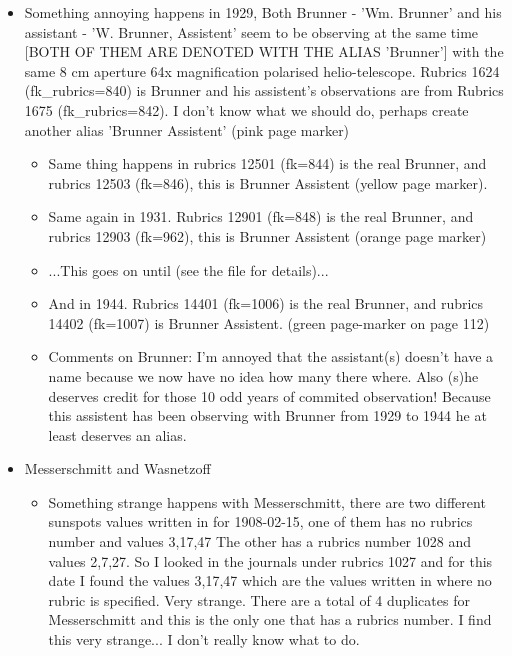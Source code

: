 \documentclass[12pt]{article}
\begin{document}
\begin{itemize}
\begin{itemize}
    \item Something annoying happens in 1929, Both Brunner - 'Wm. Brunner'  and his assistant - 'W. Brunner, Assistent' seem to be observing at the same time [BOTH OF THEM ARE DENOTED WITH THE ALIAS 'Brunner'] with the same 8 cm aperture 64x magnification polarised helio-telescope. Rubrics 1624 (fk\_rubrics=840) is Brunner and his assistent's observations are from Rubrics 1675 (fk\_rubrics=842). I don't know what we should do, perhaps create another alias 'Brunner Assistent' (pink page marker)
    \begin{itemize}
        \item Same thing happens in rubrics 12501 (fk=844) is the real Brunner, and rubrics 12503 (fk=846), this is Brunner Assistent (yellow page marker).
        \item Same again in 1931. Rubrics 12901 (fk=848) is the real Brunner, and rubrics 12903 (fk=962), this is Brunner Assistent (orange page marker)
        \item ...This goes on until (see the file for details)...
        \item And in 1944. Rubrics 14401 (fk=1006) is the real Brunner, and rubrics 14402 (fk=1007) is Brunner Assistent. (green page-marker on page 112)
        \item Comments on Brunner: I'm annoyed that the assistant(s) doesn't have a name because we now have no idea how many there where. Also (s)he deserves credit for those 10 odd years of commited observation! Because this assistent has been observing with Brunner from 1929 to 1944 he at least deserves an alias. 
    \end{itemize}
    \item Messerschmitt and Wasnetzoff
    \begin{itemize}
        \item Something strange happens with Messerschmitt, there are two different sunspots values written in for 1908-02-15, one of them has no rubrics number and values 3,17,47 The other has a rubrics number 1028 and values 2,7,27. So I looked in the journals under rubrics 1027 and for this date I found the values 3,17,47 which are the values written in where no rubric is specified. Very strange. There are a total of 4 duplicates for Messerschmitt and this is the only one that has a rubrics number. I find this very strange... I don't really know what to do. 
    \end{itemize}
    \end{itemize}
    

\end{itemize}
\end{document}
